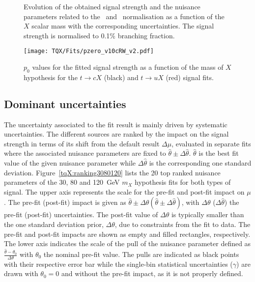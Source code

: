 \begin{figure}[htb]
    \RawFloats
    \centering
    \caption{Evolution of the obtained signal strength and the nuisance parameters related to the \ttb\ and \ttc\ normalisation as a function of the $X$ scalar mass with the corresponding uncertainties. The signal strength is normalised to 0.1\% branching fraction.
    }
    \label{tqX:fittedfactorsvsmass}
\end{figure}

\begin{figure}[htb]
    \RawFloats
    \centering
    \texttt{[image: TQX/Fits/pzero\_v10cRW\_v2.pdf]}
    \caption{$p_0$ values for the fitted signal strength as a function of the mass of $X$ hypothesis for the $t\to cX$ (black) and $t\to uX$ (red) signal fits.}
    \label{tqX:p0values}
\end{figure}
\clearpage
\subsection{Dominant uncertainties}

The uncertainty associated to the fit result is mainly driven by systematic uncertainties. The different sources are ranked by the impact on the signal strength in terms of its shift from the default result $\Delta\mu$, evaluated in separate fits where the associated nuisance parameters are fixed to $\hat{\theta}\pm\Delta\hat{\theta}$. $\hat{\theta}$ is the best fit value of the given nuisance parameter while $\Delta\hat{\theta}$ is the corresponding one standard deviation. Figure~\ref{tqX:ranking3080120} lists the 20 top ranked nuisance parameters of the 30, 80 and 120~GeV $m_X$ hypothesis fits for both types of signal. The upper axis represents the scale for the pre-fit and post-fit impact on $\mu$. The pre-fit (post-fit) impact is given as $\hat{\theta} \pm \Delta\theta (\hat{\theta} \pm \Delta\hat{\theta})$, with $\Delta\theta$ ($\Delta\hat{\theta}$) the pre-fit (post-fit) uncertainties. The post-fit value of $\Delta\hat{\theta}$ is typically smaller than the one standard deviation prior, $\Delta\theta$, due to constraints from the fit to data. The pre-fit and post-fit impacts are shown as empty and filled rectangles, respectively. The lower axis indicates the scale of the pull of the nuisance parameter defined as $\frac{\hat{\theta} -\theta_0}{\Delta\theta}$ with $\theta_0$ the nominal pre-fit value. The pulls are indicated as black points with their respective error bar while the single-bin statistical uncertainties ($\gamma$) are drawn with $\theta_0=0$ and without the pre-fit impact, as it is not properly defined.

